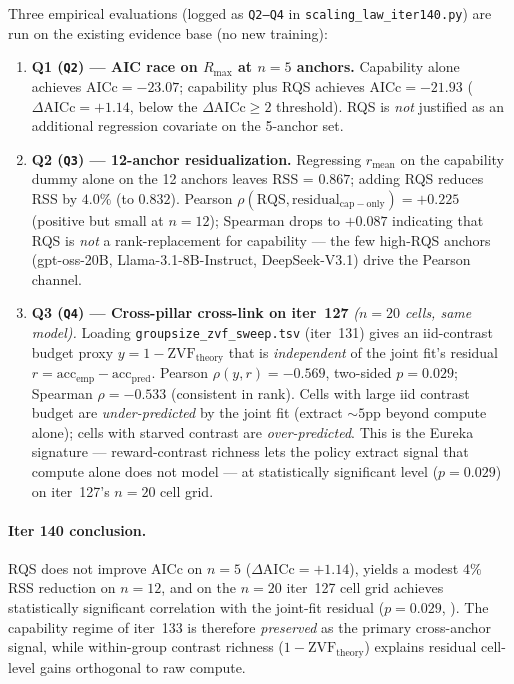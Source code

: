 Three empirical evaluations (logged as \texttt{Q2--Q4} in
\texttt{scaling\_law\_iter140.py}) are run on the existing evidence
base (no new training):
\begin{enumerate}
  \item \textbf{Q1 (\texttt{Q2}) --- AIC race on $R_{\max}$ at $n=5$ anchors.}
    Capability alone achieves
    $\mathrm{AICc} = -23.07$; capability plus RQS achieves
    $\mathrm{AICc} = -21.93$ ($\Delta \mathrm{AICc} = +1.14$,
    below the $\Delta \mathrm{AICc} \geq 2$ threshold).  RQS is \emph{not}
    justified as an additional regression covariate on the 5-anchor set.
  \item \textbf{Q2 (\texttt{Q3}) --- 12-anchor residualization.}  Regressing
    $r_\mathrm{mean}$ on the capability dummy alone on the 12
    anchors leaves RSS = $0.867$; adding RQS reduces RSS by
    $4.0\%$ (to $0.832$).  Pearson $\rho(\mathrm{RQS},
    \mathrm{residual}_\mathrm{cap-only}) = +0.225$ (positive but
    small at $n=12$); Spearman drops to $+0.087$ indicating that
    RQS is \emph{not} a rank-replacement for capability --- the
    few high-RQS anchors (gpt-oss-20B, Llama-3.1-8B-Instruct,
    DeepSeek-V3.1) drive the Pearson channel.
  \item \textbf{Q3 (\texttt{Q4}) --- Cross-pillar cross-link on iter~127}
    \emph{($n=20$ cells, same model).}  Loading
    \texttt{groupsize\_zvf\_sweep.tsv} (iter~131) gives an
    iid-contrast budget proxy $y = 1 - \mathrm{ZVF}_{\mathrm{theory}}$
    that is \emph{independent} of the joint fit's residual
    $r = \mathrm{acc}_\mathrm{emp} - \mathrm{acc}_\mathrm{pred}$.
    Pearson $\rho(y, r) = -0.569$, two-sided $p = 0.029$;
    Spearman $\rho = -0.533$ (consistent in rank).  Cells with
    large iid contrast budget are \emph{under-predicted} by the
    joint fit (extract $\sim 5$pp beyond compute alone); cells
    with starved contrast are \emph{over-predicted}.  This is the
    Eureka signature --- reward-contrast richness lets the policy
    extract signal that compute alone does not model --- at
    statistically significant level ($p = 0.029$) on iter~127's
    $n=20$ cell grid.
\end{enumerate}

\paragraph{Iter 140 conclusion.}
\label{par:scaling-iter140-conclusion}

RQS does not improve AICc on $n=5$ ($\Delta\mathrm{AICc} = +1.14$),
yields a modest $4\%$ RSS reduction on $n=12$, and on the $n=20$
iter~127 cell grid achieves statistically significant correlation with
the joint-fit residual ($p = 0.029$, ).
The capability regime of iter~133 is therefore \emph{preserved} as the
primary cross-anchor signal, while within-group contrast richness
($1 - \mathrm{ZVF}_{\mathrm{theory}}$) explains residual cell-level
gains orthogonal to raw compute.

